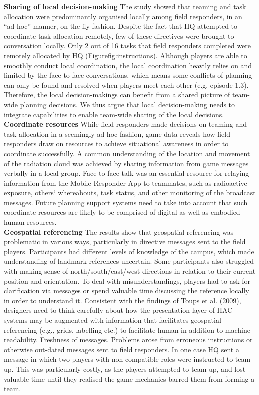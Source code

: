 \textbf{Sharing of local decision-making} The study showed that teaming and task allocation were predominantly organised locally among field responders, in an ``ad-hoc'' manner, on-the-fly fashion. Despite the fact that HQ attempted to coordinate task allocation remotely, few of these directives were brought to conversation locally. Only 2 out of 16 tasks that field responders completed were remotely allocated by HQ (Figure{fig:instructions}). Although players are able to smoothly conduct local coordination, the local coordination heavily relies on and limited by the face-to-face conversations, which means some conflicts of planning can only be found and resolved when players meet each other (e.g. episode 1.3). Therefore, the local decision-makings can benefit from a shared picture of team-wide planning decisions. We thus argue that local decision-making needs to integrate capabilities to enable team-wide sharing of the local decisions.\\

\textbf{Coordinate resources} While field responders made decisions on teaming and task allocation in a seemingly ad hoc fashion, game data reveals how field responders draw on resources to achieve situational awareness in order to coordinate successfully. A common understanding of the location and movement of the radiation cloud was achieved by sharing information from game messages verbally in a local group. Face-to-face talk was an essential resource for relaying information from the Mobile Responder App to teammates, such as radioactive exposure, others` whereabouts, task status, and other monitoring of the broadcast messages. Future planning support systems need to take into account that such coordinate resources are likely to be comprised of digital as well as embodied human resources. \\

\textbf{Geospatial referencing} The results show that geospatial referencing was problematic in various ways, particularly in directive messages sent to the field players. Participants had different levels of knowledge of the campus, which made understanding of landmark references uncertain. Some participants also struggled with making sense of north/south/east/west directions in relation to their current position and orientation. To deal with misunderstandings, players had to ask for clarification via messages or spend valuable time discussing the reference locally in order to understand it. Consistent with the findings of Toups et al. (2009), designers need to think carefully about how the presentation layer of HAC systems may be augmented with information that facilitates geospatial referencing (e.g., grids, labelling etc.) to facilitate human in addition to machine readability. Freshness of messages. Problems arose from erroneous instructions or otherwise out-dated messages sent to field responders. In one case HQ sent a message in which two players with non-compatible roles were instructed to team up. This was particularly costly, as the players attempted to team up, and lost valuable time until they realised the game mechanics barred them from forming a team.\\

